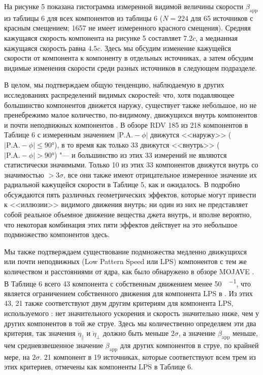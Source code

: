 На рисунке 5 показана гистограмма измеренной видимой величины скорости $\beta_\text{app}$ из
таблицы 6 для всех компонентов из таблицы 6 ($N = 224$ для 65 источников с красным смещением;
1657 не имеет измеренного красного смещения). Средняя кажущаяся скорость компонента на
рисунке 5 составляет $7.2 c$, а медианная кажущаяся скорость равна $4.5 c$. Здесь мы обсудим
изменение кажущейся скорости от компонента к компоненту в отдельных источниках, а затем обсудим
видимые изменения скорости среди разных источников в следующем подразделе.

В целом, мы подтверждаем общую тенденцию, наблюдаемую в других исследованиях распределений видимых
скоростей: что, хотя подавляющее большинство компонентов движется наружу, существует также
небольшое, но не пренебрежимо малое количество, по-видимому, движущихся внутрь компонентов и почти
неподвижных компонентов \cite{Lister_2009b,Britzen_2008}. В обзоре RDV 185 из 218 компонентов в
Таблице 6 с измеренным значением $|\text{P.A.} - \phi |$ движутся <<наружу>> ($|\text{P.A.} -
\phi|\leqslant \ang{90}$), в то время как только 33 движутся <<внутрь>> ($|\text{P.A.} - \phi| >
\ang{90}$) "--- и большинство из этих 33 измерений не являются статистически значимыми. Только 10 из
этих 33 компонентов движутся внутрь со значимостью $>3\sigma$, все они также имеют отрицательное
измеренное значение их радиальной кажущейся скорости в Таблице 5, как и ожидалось. В
\cite{Lister_2009b} подробно обсуждаются пять различных геометрических эффектов, которые могут
привести к <<иллюзии>> видимого движения внутрь; ни один из них не представляет собой реальное
объемное  движение вещества джета внутрь, и вполне вероятно, что некоторая комбинация этих пяти
эффектов действует на это небольшое подмножество компонентов здесь.

Мы также подтверждаем существование подмножества медленно движущихся или почти неподвижных (Low
Pattern Speed или LPS) компонентов с тем же количеством и расстояниями от ядра, как было
обнаружено в обзоре MOJAVE \cite{Lister_2009b}. В Таблице 6 всего 43 компонента с собственным
движением менее \SI{50}{\uas\per\year}, что является ограничением собственного движения для
компонента LPS в \cite{Lister_2009b}. Из этих 43, 21 также соответствуют двум другим критериям для
компонента LPS, используемого \cite{Lister_2009b}: нет значительного ускорения и скорость
значительно ниже, чем у других компонентов в той же струе. Здесь мы количественно определяем эти два
критерия, так значения $\dot{\eta}_{\parallel}$ и $\dot{\eta}_{\perp}$ должно быть меньше
$2\sigma$, а значение $\beta_\text{app}$ меньше, чем средневзвешенное значение $\beta_\text{app}$
для других компонентов в струе, по крайней мере, на $2\sigma$. 21 компонент в 19 источниках,
которые соответствуют всем трем из этих критериев, отмечены как компоненты LPS в Таблице 6.


